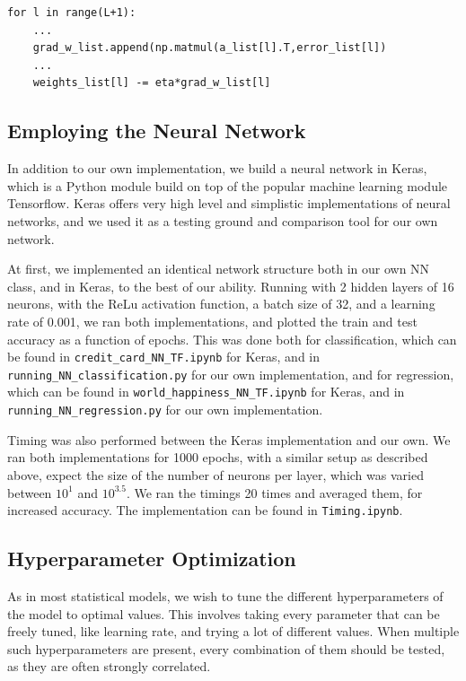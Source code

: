 \documentclass[10pt, twocolumn]{article}
\begin{document}
\begin{small}
\begin{verbatim}
for l in range(L+1):
    ...
    grad_w_list.append(np.matmul(a_list[l].T,error_list[l])
    ...
    weights_list[l] -= eta*grad_w_list[l]
\end{verbatim}
\end{small}



\subsection{Employing the Neural Network}
In addition to our own implementation, we build a neural network in Keras, which is a Python module build on top of the popular machine learning module Tensorflow. Keras offers very high level and simplistic implementations of neural networks, and we used it as a testing ground and comparison tool for our own network.

At first, we implemented an identical network structure both in our own NN class, and in Keras, to the best of our ability. Running with 2 hidden layers of 16 neurons, with the ReLu activation function, a batch size of 32, and a learning rate of 0.001, we ran both implementations, and plotted the train and test accuracy as a function of epochs. This was done both for classification, which can be found in \texttt{credit\_card\_NN\_TF.ipynb} for Keras, and in \texttt{running\_NN\_classification.py} for our own implementation, and for regression, which can be found in \texttt{world\_happiness\_NN\_TF.ipynb} for Keras, and in \texttt{running\_NN\_regression.py} for our own implementation.

Timing was also performed between the Keras implementation and our own. We ran both implementations for 1000 epochs, with a similar setup as described above, expect the size of the number of neurons per layer, which was varied between $10^1$ and $10^{3.5}$. We ran the timings 20 times and averaged them, for increased accuracy. The implementation can be found in \texttt{Timing.ipynb}.


\subsection{Hyperparameter Optimization}
\label{sec:HP_method}
As in most statistical models, we wish to tune the different hyperparameters of the model to optimal values. This involves taking every parameter that can be freely tuned, like learning rate, and trying a lot of different values. When multiple such hyperparameters are present, every combination of them should be tested, as they are often strongly correlated.
\end{document}
